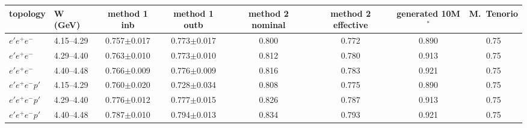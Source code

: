 \begin{tabular}{llcccccc}\toprule
topology & W (GeV) & method 1 inb & method 1 outb & method 2 nominal & method 2 effective & generated 10M$^*$ & M.~Tenorio \\\midrule
$e'e^+e^-$ & 4.15--4.29 & 0.757$\pm$0.017 & 0.773$\pm$0.017 & 0.800 & 0.772 & 0.890 & 0.75 \\
$e'e^+e^-$ & 4.29--4.40 & 0.763$\pm$0.010 & 0.773$\pm$0.010 & 0.812 & 0.780 & 0.913 & 0.75 \\
$e'e^+e^-$ & 4.40--4.48 & 0.766$\pm$0.009 & 0.776$\pm$0.009 & 0.816 & 0.783 & 0.921 & 0.75 \\
\midrule
$e'e^+e^-p'$ & 4.15--4.29 & 0.760$\pm$0.020 & 0.728$\pm$0.034 & 0.808 & 0.775 & 0.890 & 0.75 \\
$e'e^+e^-p'$ & 4.29--4.40 & 0.776$\pm$0.012 & 0.777$\pm$0.015 & 0.826 & 0.787 & 0.913 & 0.75 \\
$e'e^+e^-p'$ & 4.40--4.48 & 0.787$\pm$0.010 & 0.794$\pm$0.013 & 0.834 & 0.793 & 0.921 & 0.75 \\
\bottomrule\end{tabular}

